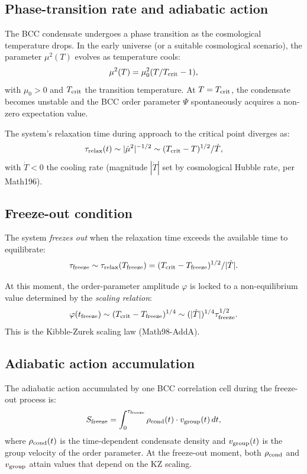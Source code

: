 \subsection{Phase-transition rate and adiabatic action}

The BCC condensate undergoes a phase transition as the cosmological temperature
drops. In the early universe (or a suitable cosmological scenario), the parameter
$\mu^2(T)$ evolves as temperature cools:
\begin{equation}
\mu^2(T) = \mu_0^2 (T/T_{\rm crit} - 1),
\end{equation}
with $\mu_0 > 0$ and $T_{\rm crit}$ the transition temperature. At $T = T_{\rm crit}$,
the condensate becomes unstable and the BCC order parameter $\Psi$ spontaneously
acquires a non-zero expectation value.

The system's relaxation time during approach to the critical point diverges as:
\begin{equation}
\tau_{\rm relax}(t) \sim |\dot{\mu}^2|^{-1/2} \sim (T_{\rm crit} - T)^{1/2} / \dot{T},
\end{equation}
with $\dot{T} < 0$ the cooling rate (magnitude $|\dot{T}|$ set by cosmological
Hubble rate, per Math196).

\subsection{Freeze-out condition}

The system \emph{freezes out} when the relaxation time exceeds the available
time to equilibrate:
\begin{equation}
\tau_{\rm freeze} \sim \tau_{\rm relax}(T_{\rm freeze}) = (T_{\rm crit} - T_{\rm freeze})^{1/2} / |\dot{T}|.
\end{equation}

At this moment, the order-parameter amplitude $\varphi$ is locked to a
non-equilibrium value determined by the \emph{scaling relation}:
\begin{equation}
\varphi(t_{\rm freeze}) \sim (T_{\rm crit} - T_{\rm freeze})^{1/4}
\sim (|\dot{T}|)^{1/4} \tau_{\rm freeze}^{1/2}.
\end{equation}
This is the Kibble-Zurek scaling law (Math98-AddA).

\subsection{Adiabatic action accumulation}

The adiabatic action accumulated by one BCC correlation cell during the freeze-out
process is:
\begin{equation}
S_{\rm freeze} = \int_0^{\tau_{\rm freeze}} \rho_{\rm cond}(t) \cdot v_{\rm group}(t) \, dt,
\end{equation}
where $\rho_{\rm cond}(t)$ is the time-dependent condensate density and
$v_{\rm group}(t)$ is the group velocity of the order parameter. At the freeze-out
moment, both $\rho_{\rm cond}$ and $v_{\rm group}$ attain values that depend on
the KZ scaling.

